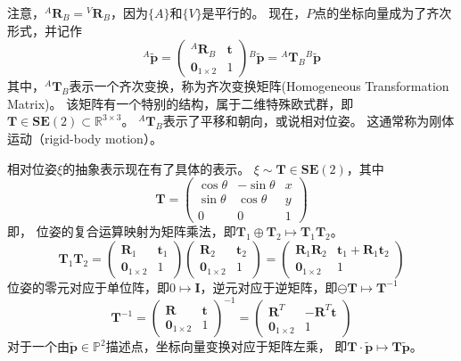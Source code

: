 \documentclass[UTF8,a4paper,10pt]{ctexart}
\begin{document}
注意，${}^A\mathbf{R}_B={}^V\mathbf{R}_B$，因为$\{A\}$和$\{V\}$是平行的。
现在，$P$点的坐标向量成为了齐次形式，并记作
\begin{equation}
  {}^A\tilde{\mathbf{p}}=
  \begin{pmatrix}{}^A\mathbf{R}_B & \mathbf{t}\\\mathbf{0}_{1\times2}&1\end{pmatrix}
  {}^B\tilde{\mathbf{p}}={}^A\mathbf{T}_B{}^B\tilde{\mathbf{p}}
\end{equation}
其中，${}^A\mathbf{T}_B$表示一个齐次变换，称为齐次变换矩阵(Homogeneous Transformation Matrix)。
该矩阵有一个特别的结构，属于二维特殊欧式群，即$\mathbf{T}\in\mathbf{SE}(2)\subset\mathbb{R}^{3\times3}$。
${}^A\mathbf{T}_B$表示了平移和朝向，或说相对位姿。
这通常称为刚体运动（rigid-body motion）。

相对位姿$\xi$的抽象表示现在有了具体的表示。
$\xi\sim\mathbf{T}\in\mathbf{SE}(2)$，其中
$$
\mathbf{T}=\begin{pmatrix}\cos\theta&-\sin\theta&x\\\sin\theta&\cos\theta&y\\0&0&1\end{pmatrix}
$$
即，
位姿的复合运算映射为矩阵乘法，即$\mathbf{T}_1\oplus\mathbf{T}_2\mapsto\mathbf{T}_1\mathbf{T}_2$。
$$
\mathbf{T}_1\mathbf{T}_2
=\begin{pmatrix}\mathbf{R}_1&\mathbf{t}_1\\\mathbf{0}_{1\times2}&1\end{pmatrix}
\begin{pmatrix}\mathbf{R}_2&\mathbf{t}_2\\\mathbf{0}_{1\times2}&1\end{pmatrix}
=\begin{pmatrix}\mathbf{R}_1\mathbf{R}_2&\mathbf{t}_1+\mathbf{R}_1\mathbf{t}_2\\\mathbf{0}_{1\times2}&1\end{pmatrix}
$$
位姿的零元对应于单位阵，即$0\mapsto\mathbf{I}$，逆元对应于逆矩阵，即$\ominus\mathbf{T}\mapsto\mathbf{T}^{-1}$
$$
\mathbf{T}^{-1}
=\begin{pmatrix}\mathbf{R}&\mathbf{t}\\\mathbf{0}_{1\times2}&1\end{pmatrix}^{-1}
=\begin{pmatrix}\mathbf{R}^T&-\mathbf{R}^T\mathbf{t}\\\mathbf{0}_{1\times2}&1\end{pmatrix}
$$
对于一个由$\tilde{\mathbf{p}}\in\mathbb{P}^2$描述点，坐标向量变换对应于矩阵左乘，
即$\mathbf{T}\cdot\tilde{\mathbf{p}}\mapsto\mathbf{T}\tilde{\mathbf{p}}$。
\end{document}
